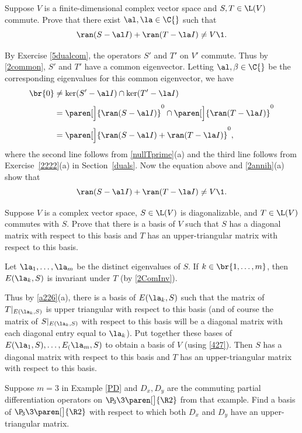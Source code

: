 \exercise
Suppose $V$ is a finite-dimensional complex vector space and $S, T \in \L(V)$ commute. Prove that there exist $\al, \la \in \C{}$ such that
\[
\ran (S - \al I) + \ran (T - \la I) \ne V\1.
\]
\exercisedisplayend

\begin{Solution}
By Exercise \ref{5dualcom}, the operators $S'$ and $T'$ on $V'$ commute. Thus by \ref{2common}, $S'$ and $T'$ have a common eigenvector. Letting $\al, \beta \in \C{}$ be the corresponding eigenvalues for this common eigenvector, we have
\begin{align*}
\br{0} &\ne \ker(S' - \al I) \cap \ker(T' - \la I) \\[3bp]
&= \paren[\Big]{\ran(S - \al I)}^0 \cap \paren[\Big]{\ran(T - \la I)}^0 \\[3bp]
&= \paren[\Big]{ \ran(S - \al I) + \ran(T - \la I)}^0,
\end{align*}
where the second line follows from \ref{nullTprime}(a) and the third line follows from Exercise~\ref{2222}(a) in Section~\ref{duals}. Now the equation above and \ref{2annih}(a) show that
\[
\ran (S - \al I) + \ran (T - \la I) \ne V\1.
\]
\end{Solution}

\exercise
Suppose $V$ is a complex vector space, $S \in \L(V)$ is diagonalizable, and $T \in \L(V)$ commutes with $S$. Prove that there is a basis of $V$ such that $S$ has a diagonal matrix with respect to this basis and $T$ has an upper-triangular matrix with respect to this basis.

\begin{Solution}
Let $\la_1, \ldots, \la_m$ be the distinct eigenvalues of $S$. If $k \in \br{1, \dots, m}$, then $E(\la_k, S)$ is invariant under $T$ (by \ref{2ComInv}).

Thus by \ref{a226}(a), there is a basis of $E(\la_k, S)$ such that the matrix of $T|_{E(\la_k, S)}$ is upper triangular with respect to this basis (and of course the matrix of $S|_{E(\la_k, S)}$ with respect to this basis will be a diagonal matrix with each diagonal entry equal to $\la_k$). Put together these bases of $E(\la_1,S),  \ldots, E_(\la_m, S)$ to obtain a basis of $V$ (using \ref{427}). Then $S$ has a diagonal matrix with respect to this basis and $T$ has an upper-triangular matrix with respect to this basis.
\end{Solution}

\exercise
Suppose $m = 3$ in Example \ref{PD} and $D_x, D_y$ are the commuting partial differentiation operators on $\P\!_3\3\paren[\big]{\R2}$ from that example. Find a basis of $\P\!_3\3\paren[\big]{\R2}$ with respect to which both $D_x$ and $D_y$ have an upper-triangular matrix.

